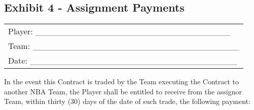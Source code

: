 \documentclass[
]{book}
\begin{document}
\newpage

\hypertarget{exhibit-4---assignment-payments}{%
\subsection{Exhibit 4 - Assignment Payments}\label{exhibit-4---assignment-payments}}

\begin{longtable}[]{@{}l@{}}
\toprule()
\endhead
Player: \_\_\_\_\_\_\_\_\_\_\_\_\_\_\_\_\_\_\_\_\_\_\_\_\_\_\_\_\_\_\_\_ \\
Team: \_\_\_\_\_\_\_\_\_\_\_\_\_\_\_\_\_\_\_\_\_\_\_\_\_\_\_\_\_\_\_\_\_\_ \\
Date: \_\_\_\_\_\_\_\_\_\_\_\_\_\_\_\_\_\_\_\_\_\_\_\_\_\_\_\_\_\_\_\_\_\_ \\
\bottomrule()
\end{longtable}

In the event this Contract is traded by the Team executing the Contract to another NBA Team, the Player shall be entitled to receive from the assignor Team, within thirty (30) days of the date of such trade, the following payment:
\end{document}
